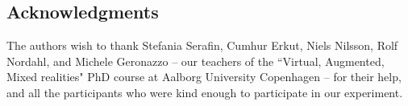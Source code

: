     \subsection*{Acknowledgments}
    The authors wish to thank Stefania Serafin, Cumhur Erkut, Niels Nilsson, Rolf Nordahl, and Michele Geronazzo -- our teachers of the ``Virtual, Augmented, Mixed realities" PhD course at Aalborg University Copenhagen -- for their help, and all the participants who were kind enough to participate in our experiment.